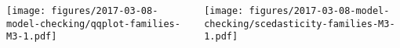 \documentclass[usenames,dvipsnames]{beamer} %
\begin{document}

\begin{frame}
\begin{columns}[t]
\begin{column}{0.5\textwidth}

\texttt{[image: figures/2017-03-08-model-checking/qqplot-families-M3-1.pdf]}
\end{column}

\begin{column}{0.5\textwidth}

\texttt{[image: figures/2017-03-08-model-checking/scedasticity-families-M3-1.pdf]}
\end{column}
\end{columns}
\end{frame}
\end{document}
